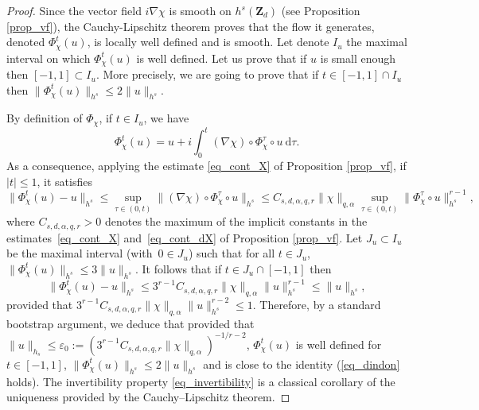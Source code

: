 \documentclass[JEP,XML,SOM,Unicode,NoEqCountersInSection,published]{cedram}
\theoremstyle{definition}
\begin{document}
\begin{proof} Since the vector field $i \nabla \chi$ is smooth on $h^s(\mathbf{Z}_d)$ (see Proposition \ref{prop_vf}), the Cauchy-Lipschitz theorem proves that the flow it generates, denoted $\Phi_\chi^{t} (u)$, is locally well defined and is smooth. Let denote $I_u$ the maximal interval on which $\Phi_\chi^{t} (u)$ is well defined. Let us prove that if $u$ is small enough then $[-1,1] \subset I_u$. More precisely, we are going to prove that if $t\in [-1,1]\cap I_u$ then $\| \Phi_\chi^{t} (u) \|_{h^s}\leq 2 \| u \|_{h^s}$.

By definition of $\Phi_\chi$, if $t\in I_u$, we have
\[
\Phi_\chi^{t} (u) = u + i \int_0^t (\nabla \chi)\circ \Phi_\chi^\tau \circ u \ \mathrm{d}\tau.
\]
As a consequence, applying the estimate \eqref{eq_cont_X} of Proposition \ref{prop_vf}, if $|t|\leq 1$, it satisfies
\[
\|\Phi_\chi^{t} (u) - u\|_{h^s} \leq \sup_{\tau \in (0,t)} \| (\nabla \chi)\circ \Phi_\chi^\tau \circ u \|_{h^s} \leq C_{s,d,\alpha,q,r} \|\chi \|_{q,\alpha} \sup_{\tau \in (0,t)} \| \Phi_\chi^\tau \circ u\|_{h^s}^{r-1},
\]
where $ C_{s,d,\alpha,q,r} >0$ denotes the maximum of the implicit constants in the estimates~\eqref{eq_cont_X} and~\eqref{eq_cont_dX} of Proposition \ref{prop_vf}. Let $J_u\subset I_u$ be the maximal interval (with~\hbox{$0\in J_u$}) such that for all $t\in J_u$, $\| \Phi_\chi^{t} (u) \|_{h^s}\leq 3 \| u \|_{h^s}$.
It follows that if $t\in J_u \cap [-1,1]$ then
\[
\|\Phi_\chi^{t} (u) - u\|_{h^s} \leq 3^{r-1} C_{s,d,\alpha,q,r} \|\chi \|_{q,\alpha} \| u \|_{h^s}^{r-1} \leq \| u \|_{h^s},
\]
provided that $3^{r-1} C_{s,d,\alpha,q,r} \|\chi \|_{q,\alpha} \| u \|_{h^s}^{r-2}\leq 1$. Therefore, by a standard bootstrap argument, we deduce that provided that $\| u \|_{h_s}\leq \varepsilon_0:= (3^{r-1} C_{s,d,\alpha,q,r} \|\chi \|_{q,\alpha})^{-1/r-2} $, $\Phi_\chi^t(u)$ is well defined for $t\in [-1,1]$, $\| \Phi_\chi^{t} (u) \|_{h^s}\leq 2 \| u \|_{h^s}$ and is close to the identity (\ie \eqref{eq_dindon} holds).
The invertibility property \eqref{eq_invertibility} is a classical corollary of the uniqueness provided by the Cauchy--Lipschitz theorem.


\end{proof}
\end{document}
